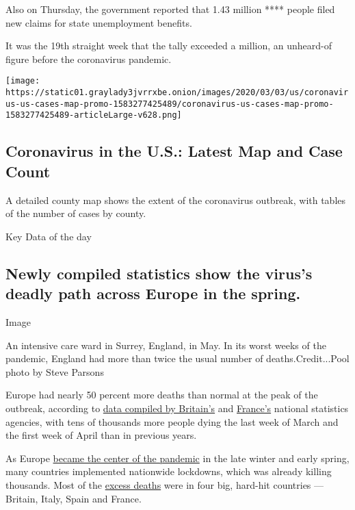 Also on Thursday, the government reported that 1.43 million **** people
filed new claims for state unemployment benefits.

It was the 19th straight week that the tally exceeded a million, an
unheard-of figure before the coronavirus pandemic.

\href{https://www.nytimes3xbfgragh.onion/interactive/2020/us/coronavirus-us-cases.html}{}

\texttt{[image: https://static01.graylady3jvrrxbe.onion/images/2020/03/03/us/coronavirus-us-cases-map-promo-1583277425489/coronavirus-us-cases-map-promo-1583277425489-articleLarge-v628.png]}

\hypertarget{coronavirus-in-the-us-latest-map-and-case-count}{%
\subsection{Coronavirus in the U.S.: Latest Map and Case
Count}\label{coronavirus-in-the-us-latest-map-and-case-count}}

A detailed county map shows the extent of the coronavirus outbreak, with
tables of the number of cases by county.

Key Data of the day

\hypertarget{newly-compiled-statistics-show-the-viruss-deadly-path-across-europe-in-the-spring}{%
\subsection{Newly compiled statistics show the virus's deadly path
across Europe in the
spring.}\label{newly-compiled-statistics-show-the-viruss-deadly-path-across-europe-in-the-spring}}

Image

An intensive care ward in Surrey, England, in May. In its worst weeks of
the pandemic, England had more than twice the usual number of
deaths.Credit...Pool photo by Steve Parsons

Europe had nearly 50 percent more deaths than normal at the peak of the
outbreak, according to
\href{https://www.ons.gov.uk/peoplepopulationandcommunity/birthsdeathsandmarriages/deaths/articles/comparisonsofallcausemortalitybetweeneuropeancountriesandregions/januarytojune2020}{data
compiled by Britain's} and
\href{https://www.insee.fr/fr/statistiques/4637552}{France's} national
statistics agencies, with tens of thousands more people dying the last
week of March and the first week of April than in previous years.

As Europe
\href{https://www.nytimes3xbfgragh.onion/2020/03/21/world/europe/italy-coronavirus-center-lessons.html}{became
the center of the pandemic} in the late winter and early spring, many
countries implemented nationwide lockdowns, which was already killing
thousands. Most of the
\href{https://www.nytimes3xbfgragh.onion/interactive/2020/04/21/world/coronavirus-missing-deaths.html}{excess
deaths} were in four big, hard-hit countries --- Britain, Italy, Spain
and France.

